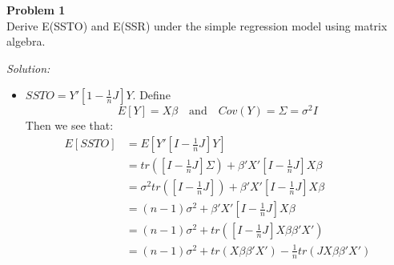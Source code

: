 \documentclass{article}
\newenvironment{problem}[2][Problem]
    { \begin{mdframed}[backgroundcolor=gray!20] \textbf{#1 #2} \\}
    {  \end{mdframed}}
\newenvironment{solution}
    {\textit{Solution:}}
    {}
\begin{document}
\begin{problem}{1}
Derive E(SSTO) and E(SSR) under the simple regression model using matrix algebra.
\end{problem}
\begin{solution}
\begin{itemize}
\item $SSTO = Y' \left [1 - \frac{1}{n}J \right ] Y$. Define 
$$E[Y] = X \beta  \ \ \ \text{ and } \ \ \ Cov(Y) = \Sigma = \sigma^2 I$$
Then we see that: 
\begin{align*}
E[SSTO] &= E \left [Y' \left [I - \frac{1}{n}J \right ] Y \right ] \\
& = tr(\left [I - \frac{1}{n}J \right ]  \Sigma) + \beta' X' \left [I - \frac{1}{n}J \right ]  X \beta \\
&= \sigma^2 tr(\left [I - \frac{1}{n}J \right ] ) + \beta' X' \left [I - \frac{1}{n}J \right ]  X \beta \\
&= (n - 1) \sigma^2 +  \beta' X' \left [I - \frac{1}{n}J \right ]  X \beta \\
&= (n - 1) \sigma^2 +  tr \left ( \left [I - \frac{1}{n}J \right ]  X \beta \beta' X' \right)  \\
&= (n-1) \sigma^2 + tr(X\beta \beta' X') - \frac{1}{n} tr(J X\beta\beta' X')

\end{align*}
\end{itemize}
\end{solution}
\end{document}
